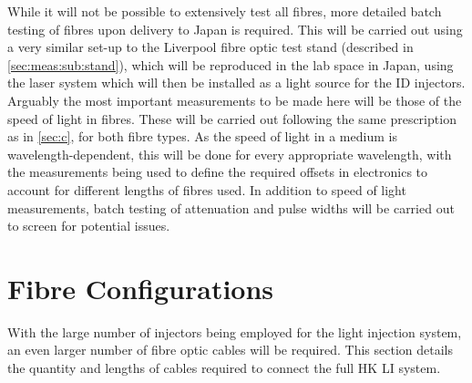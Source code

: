 \documentclass[a4paper,11pt]{article}
\begin{document}
While it will not be possible to extensively test all fibres, more detailed batch testing of fibres upon delivery to Japan is required. This will be carried out using a very similar set-up to the Liverpool fibre optic test stand (described in \cref{sec:meas:sub:stand}), which will be reproduced in the lab space in Japan, using the laser system which will then be installed as a light source for the ID injectors. Arguably the most important measurements to be made here will be those of the speed of light in fibres. These will be carried out following the same prescription as in \cref{sec:c}, for both fibre types. As the speed of light in a medium is wavelength-dependent, this will be done for every appropriate wavelength, with the measurements being used to define the required offsets in electronics to account for different lengths of fibres used. In addition to speed of light measurements, batch testing of attenuation and pulse widths will be carried out to screen for potential issues.


\section{Fibre Configurations}\label{sec:lengths}

With the large number of injectors being employed for the light injection system, an even larger number of fibre optic cables will be required. This section details the quantity and lengths of cables required to connect the full HK LI system.
\end{document}
